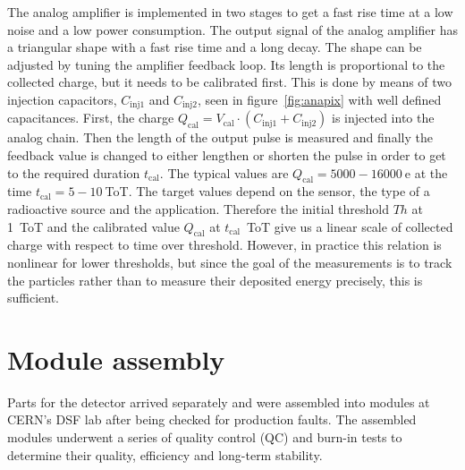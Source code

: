 The analog amplifier is implemented in two stages to get a fast rise time at a low noise and a low power consumption. The output signal of the analog amplifier has a triangular shape with a fast rise time and a long decay.  The shape can be adjusted by tuning the amplifier feedback loop. Its length is proportional to the collected charge, but it needs to be calibrated first. This is done by means of two injection capacitors, $C_\mathrm{inj1}$ and $C_\mathrm{inj2}$, seen in figure~\ref{fig:anapix} with well defined capacitances. First, the charge $Q_\mathrm{cal}=V_\mathrm{cal}\cdot(C_\mathrm{inj1}+C_\mathrm{inj2})$ is injected into the analog chain. Then the length of the output pulse is measured and finally the feedback value is changed to either lengthen or shorten the pulse in order to get to the required duration $t_\mathrm{cal}$. The typical values are $Q_\mathrm{cal}=5000-16000~$e at the time $t_\mathrm{cal}=5-10~$ToT. The target values depend on the sensor, the type of a radioactive source and the application. Therefore the initial threshold $Th$ at 1~ToT and the calibrated value $Q_\mathrm{cal}$ at $t_\mathrm{cal}$~ToT give us a linear scale of collected charge with respect to time over threshold.
However, in practice this relation is nonlinear for lower thresholds, but since the goal of the measurements is to track the particles rather than to measure their deposited energy precisely, this is sufficient. 


\section{Module assembly}
\label{sec:modass}
Parts for the detector arrived separately and were assembled into modules at CERN's DSF lab after being checked for production faults. The assembled modules underwent a series of quality control (QC) and burn-in tests to determine their quality, efficiency and long-term stability.

